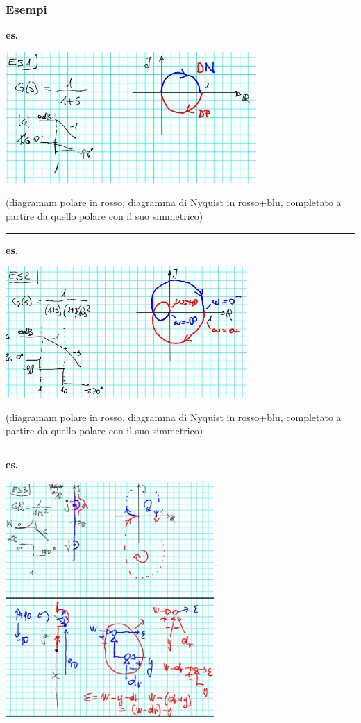 \subsubsection{Esempi}
\textbf{es.} 
\begin{center}
    \includegraphics[height=5cm]{../lezione18/img8.JPG}
\end{center}
(diagramam polare in rosso, diagramma di Nyquist in rosso+blu, completato a partire da quello polare con il suo simmetrico)\newline
\rule{\textwidth}{0,4pt}
\textbf{es.} 
\begin{center}
    \includegraphics[height=5cm]{../lezione18/img9.JPG}
\end{center}
(diagramam polare in rosso, diagramma di Nyquist in rosso+blu, completato a partire da quello polare con il suo simmetrico)\newline
\rule{\textwidth}{0,4pt}
\textbf{es.} 
\begin{center}
    \includegraphics[height=9cm]{../lezione18/img10.JPG}
\end{center}
